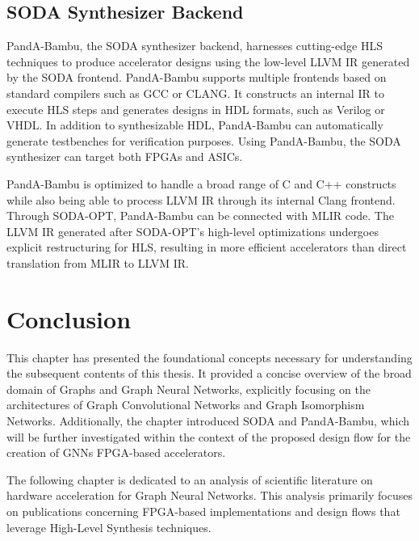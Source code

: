 \subsection{SODA Synthesizer Backend}
\label{subsec:soda_backend}%

PandA-Bambu, the SODA synthesizer backend, harnesses cutting-edge HLS techniques to produce accelerator designs using the low-level LLVM IR generated by the SODA frontend.
PandA-Bambu supports multiple frontends based on standard compilers such as GCC or CLANG.
It constructs an internal IR to execute HLS steps and generates designs in HDL formats, such as Verilog or VHDL.
In addition to synthesizable HDL, PandA-Bambu can automatically generate testbenches for verification purposes.
Using PandA-Bambu, the SODA synthesizer can target both FPGAs and ASICs.

PandA-Bambu is optimized to handle a broad range of C and C++ constructs while also being able to process LLVM IR through its internal Clang frontend.
Through SODA-OPT, PandA-Bambu can be connected with MLIR code.
The LLVM IR generated after SODA-OPT's high-level optimizations undergoes explicit restructuring for HLS, resulting in more efficient accelerators than direct translation from MLIR to LLVM IR.

\section{Conclusion}
\label{sec:background_conclusion}%
This chapter has presented the foundational concepts necessary for understanding the subsequent contents of this thesis.
It provided a concise overview of the broad domain of Graphs and Graph Neural Networks, explicitly focusing on the architectures of Graph Convolutional Networks and Graph Isomorphism Networks.
Additionally, the chapter introduced SODA and PandA-Bambu, which will be further investigated within the context of the proposed design flow for the creation of GNNs FPGA-based accelerators.

The following chapter is dedicated to an analysis of scientific literature on hardware acceleration for Graph Neural Networks.
This analysis primarily focuses on publications concerning FPGA-based implementations and design flows that leverage High-Level Synthesis techniques.
